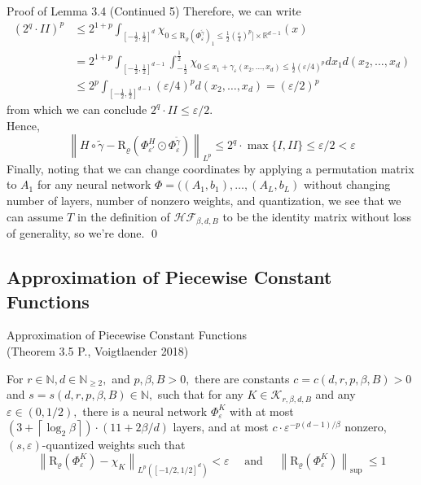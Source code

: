 \documentclass{if-beamer}
\newcommand{\norm}[2]{\left\lVert#1\right\rVert_{#2}}
\begin{document}
\begin{frame}{Proof of Lemma 3.4 (Continued 5)}
    Therefore, we can write
    {\small
    \begin{align*}
        (2^q \cdot II)^p &\leq 2^{1+p} \int_{[-\frac{1}{2},\frac{1}{2}]^{d}} \chi_{0\leq \mathrm{R}_{\varrho}(\Phi_{\varepsilon}^{\widetilde{\gamma}})_1 \leq \frac{1}{2}(\frac{\varepsilon}{4})^p] \times \mathbb{R}^{d-1}}(x)\\
        &= 2^{1+p} \int_{[-\frac{1}{2},\frac{1}{2}]^{d-1}} \int_{-\frac{1}{2}}^{\frac{1}{2}} \chi_{0\leq x_1+\gamma_{\varepsilon}(x_2,\dots,x_d)\leq \frac{1}{2}(\varepsilon/4)^p} dx_1 d(x_2,\dots,x_d)\\
        &\leq 2^p \int_{[-\frac{1}{2},\frac{1}{2}]^{d-1}}(\varepsilon/4)^p d(x_2,\dots,x_d) = (\varepsilon/2)^p
    \end{align*}
    }%
    from which we can conclude $2^q \cdot II \leq \varepsilon/2$.\\
    Hence,
    {\small
    $$ \norm{H \circ \widetilde{\gamma} - \mathrm{R}_{\varrho}(\Phi_{\varepsilon'}^H \odot \Phi_{\varepsilon}^{\widetilde{\gamma}})}{L^p} \leq 2^q \cdot \max\{I, II\} \leq \varepsilon/2 < \varepsilon$$
    }%
    Finally, noting that we can change coordinates by applying a permutation matrix to $A_1$ for any neural network $\Phi = ((A_1,b_1), \dots, (A_L,b_L)$ without changing number of layers, number of nonzero weights, and quantization, we see that we can assume $T$ in the definition of $\mathcal{HF}_{\beta,d,B}$ to be the identity matrix without loss of generality, so we're done. \qed 
\end{frame}

\subsection{Approximation of Piecewise Constant Functions}
\begin{frame}{Approximation of Piecewise Constant Functions \\ (Theorem 3.5 P., Voigtlaender 2018)}
    \begin{tcolorbox}
    For $r \in \mathbb{N}, d \in \mathbb{N}_{\geq 2},$ and $p, \beta, B>0,$ there are constants $c=c(d, r, p, \beta, B)>0$ and $s=s(d, r, p, \beta, B) \in \mathbb{N},$ such that for any $K \in \mathcal{K}_{r, \beta, d, B}$ and any $\varepsilon \in(0,1 / 2),$ there is a neural network $\Phi_{\varepsilon}^{K}$ with at most $\left(3+\left\lceil\log _{2} \beta\right\rceil\right) \cdot(11+2 \beta / d)$ layers, and at most $c \cdot \varepsilon^{-p(d-1) / \beta}$ nonzero, $(s, \varepsilon)$-quantized weights such that {\small
    \[
    \left\|\mathrm{R}_{\varrho}\left(\Phi_{\varepsilon}^{K}\right)-\chi_{K}\right\|_{L^{p}\left([-1 / 2,1 / 2]^{d}\right)}<\varepsilon \quad \text { and } \quad\left\|\mathrm{R}_{\varrho}\left(\Phi_{\varepsilon}^{K}\right)\right\|_{\text {sup }} \leq 1
    \]}
    \end{tcolorbox}
\end{frame}
\end{document}
